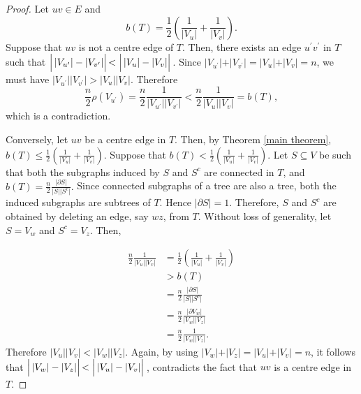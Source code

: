 \documentclass[12pt]{article}
\begin{document}
\begin{proof}
   Let $uv \in E$ and 
   $$
b(T)=\frac{1}{2}\left(\frac{1}{\vert V_u \vert} +\frac{1}{\vert V_v\vert} \right).
   $$
  Suppose that $uv$ is not a centre edge of $T$. Then, there exists an edge $u^\prime v^\prime$ in $T$ such that $ \Bigl|\,\vert V_{u^\prime} \vert-\vert V_{v^\prime}\vert \Bigl|\, < \Bigl|\,\vert V_u\vert-\vert V_v\vert \Bigl|\,$. Since $\vert V_{u^\prime}\vert+\vert V_{v^\prime}\vert=\vert V_{u}\vert+\vert V_{v}\vert=n$, we must have $\vert V_{u^\prime} \vert \vert V_{v^\prime}\vert >\vert V_{u}\vert \vert V_{v}\vert$. Therefore 
   $$
   \frac{n}{2} \rho(V_{u^\prime})=\frac{n}{2}\frac{1}{\vert V_{u^\prime} \vert \vert V_{v^\prime}\vert}< \frac{n}{2}\frac{1}{\vert V_{u}\vert \vert V_{v}\vert}=b(T),
   $$
   which is a contradiction.
   
   Conversely, let $uv$ be a centre edge in $T$. Then, by Theorem \ref{main theorem},  $b(T) \leq \frac{1}{2}\left(\frac{1}{\vert V_u \vert} +\frac{1}{\vert V_v\vert} \right).$ Suppose that $b(T) <\frac{1}{2}\left(\frac{1}{\vert V_u \vert} +\frac{1}{\vert V_v\vert} \right) .$ 
   Let $S \subseteq V$ be such that both the subgraphs induced by $S$ and $S^c$ are connected  in $T$,  and $b(T)=\frac{n}{2} \frac{\vert\partial S \vert}{\vert S \vert \vert S^c \vert}.$ Since connected subgraphs of a tree are also a tree, both the induced subgraphs are subtrees of $T$. Hence $\vert \partial S\vert=1$. Therefore, $S$ and $S^c$ are obtained by deleting an edge, say  $wz$, from $T$. Without loss of generality, let $S=V_w$ and $S^c=V_z.$ Then,


   \begin{align*}
 \frac{n}{2} \frac{1}{\vert V_{u}\vert \vert V_{v}\vert} &= \frac{1}{2}\left(\frac{1}{\vert V_u \vert} +\frac{1}{\vert V_v\vert} \right)\\
    &>b(T)\\
    &=\frac{n}{2} \frac{\vert\partial S \vert}{\vert S \vert \vert S^c \vert}\\
    &=\frac{n}{2} \frac{\vert \partial V_w \vert}{\vert V_w \vert \vert V_z \vert }\\
    &=\frac{n}{2} \frac{1}{\vert V_w \vert \vert V_z \vert}.
\end{align*}
   Therefore $\vert V_{u}\vert \vert V_{v}\vert < \vert V_w \vert \vert V_z \vert$. Again, by using $\vert V_w\vert+\vert V_z\vert=\vert V_{u}\vert+\vert V_{v}\vert=n$, it follows that 
    $ \Bigl|\,\vert V_w \vert-\vert V_z\vert \Bigl|\, < \Bigl|\,\vert V_u\vert-\vert V_v\vert \Bigl|\,$, contradicts the fact that $uv$ is a centre edge in $T$.
\end{proof}
\end{document}
